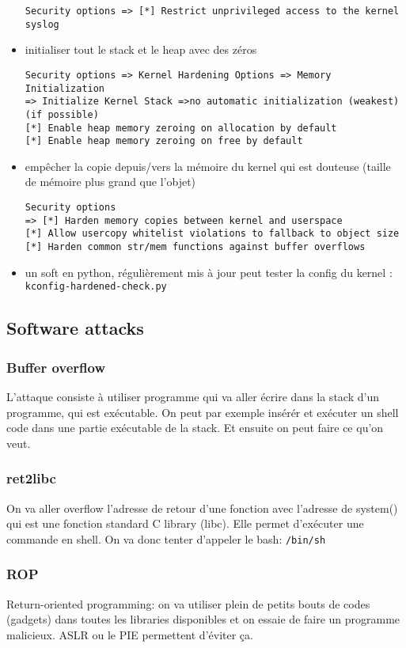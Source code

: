 \begin{itemize}
\begin{Verbatim}[breaklines=true, breakanywhere=true]
Security options => [*] Restrict unprivileged access to the kernel syslog
\end{Verbatim}
\item initialiser tout le stack et le heap avec des zéros
\begin{Verbatim}[breaklines=true, breakanywhere=true]
Security options => Kernel Hardening Options => Memory Initialization
=> Initialize Kernel Stack =>no automatic initialization (weakest) (if possible)
[*] Enable heap memory zeroing on allocation by default
[*] Enable heap memory zeroing on free by default
\end{Verbatim}
\item empêcher la copie depuis/vers la mémoire du kernel qui est douteuse (taille de mémoire plus grand que l'objet)
\begin{Verbatim}[breaklines=true, breakanywhere=true]
Security options 
=> [*] Harden memory copies between kernel and userspace
[*] Allow usercopy whitelist violations to fallback to object size
[*] Harden common str/mem functions against buffer overflows
\end{Verbatim}
\item un soft en python, régulièrement mis à jour peut tester la config du kernel : \verb!kconfig-hardened-check.py!
\end{itemize}

\subsection{Software attacks}
\subsubsection{Buffer overflow}
L'attaque consiste à utiliser programme qui va aller écrire dans la stack d'un programme, qui est exécutable. On peut par exemple insérér et exécuter un shell code dans une partie exécutable de la stack. Et ensuite on peut faire ce qu'on veut.
\subsubsection{ret2libc}
On va aller overflow l'adresse de retour d'une fonction avec l'adresse de system() qui est une fonction standard C library (libc). Elle permet d'exécuter une commande en shell. On va donc tenter d'appeler le bash: \verb!/bin/sh!
\subsubsection{ROP}
Return-oriented programming: on va utiliser plein de petits bouts de codes (gadgets) dans toutes les libraries disponibles et on essaie de faire un programme malicieux. ASLR ou le PIE permettent d'éviter ça.
